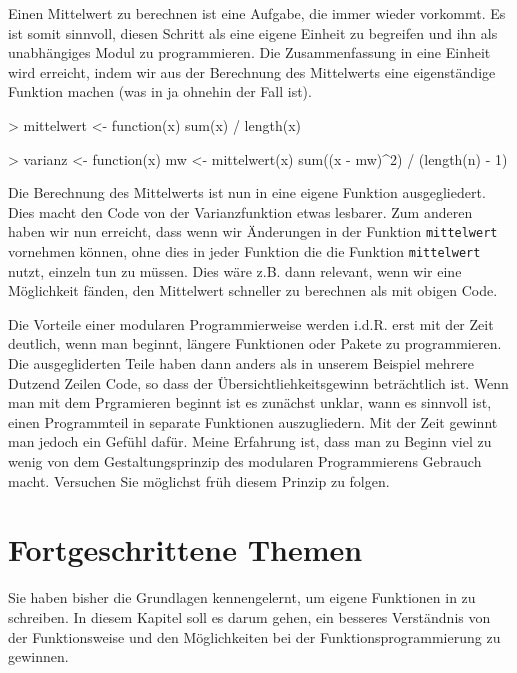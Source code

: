 \documentclass[12pt, a4paper,twoside,openany,x11names,svgnames]{memoir}
\begin{document}
Einen Mittelwert zu berechnen ist eine Aufgabe, die immer wieder vorkommt. Es ist somit sinnvoll, diesen Schritt als eine eigene Einheit zu begreifen und ihn als unabhängiges Modul zu programmieren. Die Zusammenfassung in eine Einheit wird erreicht, indem wir aus der Berechnung des Mittelwerts eine eigenständige Funktion machen (was in \R{} ja ohnehin der Fall ist). 

\begin{Schunk}
\begin{Sinput}
> mittelwert <- function(x) {
    sum(x) / length(x)
 }
\end{Sinput}
\end{Schunk}
\begin{Schunk}
\begin{Sinput}
> varianz <- function(x) {
   mw <- mittelwert(x)
   sum((x - mw)^2) / (length(n) - 1)
 }
\end{Sinput}
\end{Schunk}

Die Berechnung des Mittelwerts ist nun in eine eigene Funktion ausgegliedert. Dies macht den Code von der Varianzfunktion etwas lesbarer. Zum anderen haben wir nun erreicht, dass wenn wir Änderungen in der Funktion \texttt{mittelwert} vornehmen können, ohne dies in jeder Funktion die die Funktion \texttt{mittelwert} nutzt, einzeln tun zu müssen. Dies wäre z.B. dann relevant, wenn wir eine Möglichkeit fänden, den Mittelwert schneller zu berechnen als mit obigen Code. 

Die Vorteile einer modularen Programmierweise werden i.d.R. erst mit der Zeit deutlich, wenn man beginnt, längere Funktionen oder Pakete zu programmieren. Die ausgegliderten Teile haben dann anders als in unserem Beispiel mehrere Dutzend Zeilen Code, so dass der Übersichtliehkeitsgewinn beträchtlich ist. Wenn man mit dem Prgramieren beginnt ist es zunächst unklar, wann es sinnvoll ist, einen Programmteil in separate Funktionen auszugliedern. Mit der Zeit gewinnt man jedoch ein Gefühl dafür. Meine Erfahrung ist, dass man zu Beginn viel zu wenig von dem Gestaltungsprinzip des modularen Programmierens Gebrauch macht. Versuchen Sie möglichst früh diesem Prinzip zu folgen.



\section{Fortgeschrittene Themen} \label{sec:funktionen_fortgeschritte_themen}

Sie haben bisher die Grundlagen kennengelernt, um eigene Funktionen in \R{} zu schreiben. In diesem Kapitel soll es darum gehen, ein besseres Verständnis von der Funktionsweise und den Möglichkeiten bei der Funktionsprogrammierung zu gewinnen.
\end{document}
